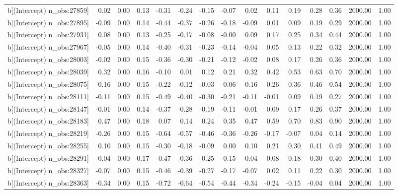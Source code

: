 \begin{table}[ht]
\begin{tabular}{rrrrrrrrrrrrrrr}
  b[(Intercept) n\_obs:27859] & 0.02 & 0.00 & 0.13 & -0.31 & -0.24 & -0.15 & -0.07 & 0.02 & 0.11 & 0.19 & 0.28 & 0.36 & 2000.00 & 1.00 \\ 
  b[(Intercept) n\_obs:27895] & -0.09 & 0.00 & 0.14 & -0.44 & -0.37 & -0.26 & -0.18 & -0.09 & 0.01 & 0.09 & 0.19 & 0.29 & 2000.00 & 1.00 \\ 
  b[(Intercept) n\_obs:27931] & 0.08 & 0.00 & 0.13 & -0.25 & -0.17 & -0.08 & -0.00 & 0.09 & 0.17 & 0.25 & 0.34 & 0.44 & 2000.00 & 1.00 \\ 
  b[(Intercept) n\_obs:27967] & -0.05 & 0.00 & 0.14 & -0.40 & -0.31 & -0.23 & -0.14 & -0.04 & 0.05 & 0.13 & 0.22 & 0.32 & 2000.00 & 1.00 \\ 
  b[(Intercept) n\_obs:28003] & -0.02 & 0.00 & 0.15 & -0.36 & -0.30 & -0.21 & -0.12 & -0.02 & 0.08 & 0.17 & 0.26 & 0.36 & 2000.00 & 1.00 \\ 
  b[(Intercept) n\_obs:28039] & 0.32 & 0.00 & 0.16 & -0.10 & 0.01 & 0.12 & 0.21 & 0.32 & 0.42 & 0.53 & 0.63 & 0.70 & 2000.00 & 1.00 \\ 
  b[(Intercept) n\_obs:28075] & 0.16 & 0.00 & 0.15 & -0.22 & -0.12 & -0.03 & 0.06 & 0.16 & 0.26 & 0.36 & 0.46 & 0.54 & 2000.00 & 1.00 \\ 
  b[(Intercept) n\_obs:28111] & -0.11 & 0.00 & 0.15 & -0.49 & -0.40 & -0.30 & -0.21 & -0.11 & -0.01 & 0.09 & 0.19 & 0.27 & 2000.00 & 1.00 \\ 
  b[(Intercept) n\_obs:28147] & -0.01 & 0.00 & 0.14 & -0.37 & -0.28 & -0.19 & -0.11 & -0.01 & 0.09 & 0.17 & 0.26 & 0.37 & 2000.00 & 1.00 \\ 
  b[(Intercept) n\_obs:28183] & 0.47 & 0.00 & 0.18 & 0.07 & 0.14 & 0.24 & 0.35 & 0.47 & 0.59 & 0.70 & 0.83 & 0.90 & 2000.00 & 1.00 \\ 
  b[(Intercept) n\_obs:28219] & -0.26 & 0.00 & 0.15 & -0.64 & -0.57 & -0.46 & -0.36 & -0.26 & -0.17 & -0.07 & 0.04 & 0.14 & 2000.00 & 1.00 \\ 
  b[(Intercept) n\_obs:28255] & 0.10 & 0.00 & 0.15 & -0.30 & -0.18 & -0.09 & 0.00 & 0.10 & 0.21 & 0.30 & 0.41 & 0.49 & 2000.00 & 1.00 \\ 
  b[(Intercept) n\_obs:28291] & -0.04 & 0.00 & 0.17 & -0.47 & -0.36 & -0.25 & -0.15 & -0.04 & 0.08 & 0.18 & 0.30 & 0.40 & 2000.00 & 1.00 \\ 
  b[(Intercept) n\_obs:28327] & -0.07 & 0.00 & 0.15 & -0.46 & -0.39 & -0.27 & -0.17 & -0.07 & 0.02 & 0.11 & 0.22 & 0.30 & 2000.00 & 1.00 \\ 
  b[(Intercept) n\_obs:28363] & -0.34 & 0.00 & 0.15 & -0.72 & -0.64 & -0.54 & -0.44 & -0.34 & -0.24 & -0.15 & -0.04 & 0.04 & 2000.00 & 1.00 \\ 

\end{tabular}
\end{table}
